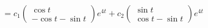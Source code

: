 \documentclass{article}
\begin{document}
\begin{align*}
             & = c_1 \begin{pmatrix}
                       \cos t \\
                       -\cos t - \sin t
                     \end{pmatrix} e^{4 t} + c_2 \begin{pmatrix}
                                                   \sin t \\
                                                   \cos t - \sin t
                                                 \end{pmatrix} e^{4 t}
\end{align*}

\setcounter{subsubsection}{38}
\subsubsection{}
\end{document}
